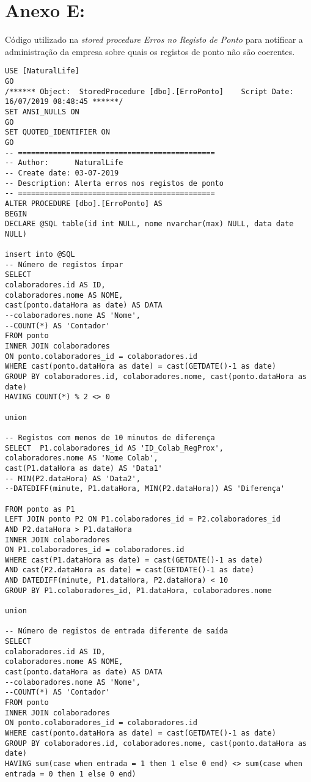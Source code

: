 \chapter{Anexo E: }
\label{anexo:E}
Código utilizado na \textit{stored procedure Erros no Registo de Ponto} para notificar a administração da empresa sobre quais os registos de ponto não são coerentes.

\begin{verbatim}
USE [NaturalLife]
GO
/****** Object:  StoredProcedure [dbo].[ErroPonto]    Script Date: 16/07/2019 08:48:45 ******/
SET ANSI_NULLS ON
GO
SET QUOTED_IDENTIFIER ON
GO
-- =============================================
-- Author:		NaturalLife
-- Create date: 03-07-2019
-- Description:	Alerta erros nos registos de ponto
-- =============================================
ALTER PROCEDURE [dbo].[ErroPonto] AS
BEGIN
DECLARE @SQL table(id int NULL, nome nvarchar(max) NULL, data date NULL)

insert into @SQL
-- Número de registos ímpar
SELECT
colaboradores.id AS ID,
colaboradores.nome AS NOME,
cast(ponto.dataHora as date) AS DATA
--colaboradores.nome AS 'Nome',
--COUNT(*) AS 'Contador'
FROM ponto
INNER JOIN colaboradores
ON ponto.colaboradores_id = colaboradores.id
WHERE cast(ponto.dataHora as date) = cast(GETDATE()-1 as date)
GROUP BY colaboradores.id, colaboradores.nome, cast(ponto.dataHora as date)
HAVING COUNT(*) % 2 <> 0

union

-- Registos com menos de 10 minutos de diferença
SELECT  P1.colaboradores_id AS 'ID_Colab_RegProx',
colaboradores.nome AS 'Nome Colab',
cast(P1.dataHora as date) AS 'Data1'
-- MIN(P2.dataHora) AS 'Data2',
--DATEDIFF(minute, P1.dataHora, MIN(P2.dataHora)) AS 'Diferença'

FROM ponto as P1
LEFT JOIN ponto P2 ON P1.colaboradores_id = P2.colaboradores_id
AND P2.dataHora > P1.dataHora
INNER JOIN colaboradores
ON P1.colaboradores_id = colaboradores.id
WHERE cast(P1.dataHora as date) = cast(GETDATE()-1 as date)
AND cast(P2.dataHora as date) = cast(GETDATE()-1 as date)
AND DATEDIFF(minute, P1.dataHora, P2.dataHora) < 10
GROUP BY P1.colaboradores_id, P1.dataHora, colaboradores.nome

union

-- Número de registos de entrada diferente de saída
SELECT
colaboradores.id AS ID,
colaboradores.nome AS NOME,
cast(ponto.dataHora as date) AS DATA
--colaboradores.nome AS 'Nome',
--COUNT(*) AS 'Contador'
FROM ponto
INNER JOIN colaboradores
ON ponto.colaboradores_id = colaboradores.id
WHERE cast(ponto.dataHora as date) = cast(GETDATE()-1 as date)
GROUP BY colaboradores.id, colaboradores.nome, cast(ponto.dataHora as date)
HAVING sum(case when entrada = 1 then 1 else 0 end) <> sum(case when entrada = 0 then 1 else 0 end)


\end{verbatim}
